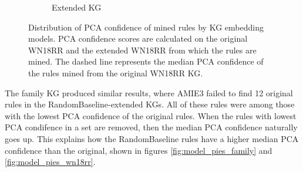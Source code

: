 \begin{figure}[h]
\begin{subfigure}{.5\textwidth}
  \caption{Extended KG}
  \label{fig:_PCA_models_wn18rr_boxplot_sub}
\end{subfigure}
\caption{Distribution of PCA confidence of mined rules by KG embedding models. PCA confidence scores are calculated on the original WN18RR and the extended WN18RR from which the rules are mined. The dashed line represents the median PCA confidence of the rules mined from the original WN18RR KG.}
\label{fig:PCA_models_wn18rr_boxplot}
\end{figure}

The family KG produced similar results, where AMIE3 failed to find 12 original rules in the RandomBaseline-extended KGs. All of these rules were among those with the lowest PCA confidence of the original rules. When the rules with lowest PCA condifence in a set are removed, then the median PCA confidence naturally goes up. This explains how the RandomBaseline rules have a higher median PCA confidence than the original, shown in figures \ref{fig:model_pies_family} and \ref{fig:model_pies_wn18rr}.

